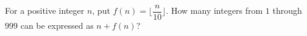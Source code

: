 For a positive integer $n$, put $f (n) = \lfloor \dfrac{n}{10} \rfloor$. How many integers from $1$ through $999$ can be expressed as $n+f(n)$?
